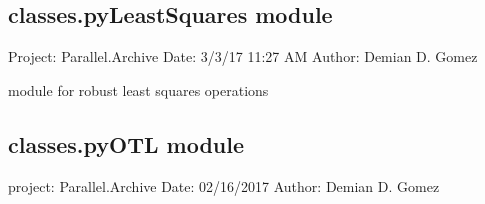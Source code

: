 \documentclass[letterpaper,10pt,english]{sphinxmanual}
\begin{document}
\subsection{classes.pyLeastSquares module}
\label{\detokenize{classes:module-classes.pyLeastSquares}}\label{\detokenize{classes:classes-pyleastsquares-module}}
\sphinxAtStartPar
Project: Parallel.Archive
Date: 3/3/17 11:27 AM
Author: Demian D. Gomez

\sphinxAtStartPar
module for robust least squares operations

\begin{fulllineitems}
\label{\detokenize{classes:classes.pyLeastSquares.adjust_lsq}}
\pysigstartsignatures
{}
\pysigstopsignatures
\end{fulllineitems}


\begin{fulllineitems}
\label{\detokenize{classes:classes.pyLeastSquares.rotate_vector}}
\pysigstartsignatures
{}
\pysigstopsignatures
\end{fulllineitems}



\subsection{classes.pyOTL module}
\label{\detokenize{classes:module-classes.pyOTL}}\label{\detokenize{classes:classes-pyotl-module}}
\sphinxAtStartPar
project: Parallel.Archive
Date: 02/16/2017
Author: Demian D. Gomez
\end{document}
